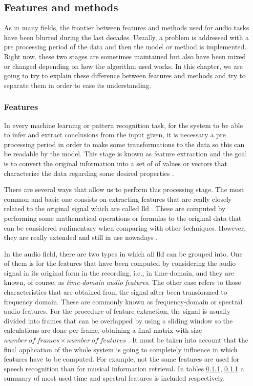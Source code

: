 
\subsection{Features and methods}
	
	As in many fields, the frontier between features and methods used for audio tasks have been blurred during the last decades. Usually, a problem is addressed with a pre processing period of the data and then the model or method is implemented. Right now, these two stages are sometimes maintained but also have been mixed or changed depending on how the algorithm used works. In this chapter, we are going to try to explain these difference between features and methods and try to separate them in order to ease its understanding.

\subsubsection{Features}

	In every machine learning or pattern recognition task, for the system to be able to infer and extract conclusions from the input given, it is necessary a pre processing period in order to make some transformations to the data so this can be readable by the model. This stage is known as feature extraction and the goal is to convert the original information into a set of of values or vectors that characterize the data regarding some desired properties \cite{Giannakopoulos2014}.
	
	There are several ways that allow us to perform this processing stage. The most common and basic one consists on extracting features that are really closely related to the original signal which are called \acrfull{lld}  \cite{Amatriain2004}. These are computed by performing some mathematical operations or formulas to the original data that can be considered rudimentary when comparing with other techniques. However, they are really extended and still in use nowadays \cite{Marr1982}. 
	
	In the audio field, there are two types in which all \acrshort{lld} can be grouped into. One of them is for the features that have been computed by considering the audio signal in its original form in the recording, i.e., in time-domain, and they are known, of course, as \textit{time-domain audio features}. The other case refers to those characteristics that are obtained from the signal after been transformed to frequency domain. These are commonly known as frequency-domain or spectral audio features. For the procedure of feature extraction, the signal is usually divided into frames that can be overlapped by using a sliding window so the calculations are done per frame, obtaining a final matrix with size $number\ of\ frames \times number\ of\ features$ \cite{Giannakopoulos2014}. It must be taken into account that the final application of the whole system is going to completely influence in which features have to be computed. For example, not the same features are used for speech recognition than for musical information retrieval. In tables \ref{}, \ref{} a summary of most used time and spectral features is included respectively.
	
